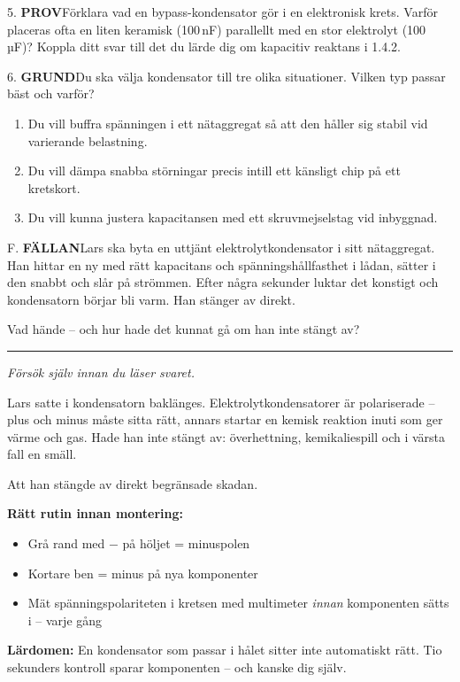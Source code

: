 \documentclass[a4paper,11pt,twoside]{book}
\newcommand{\qgrund}{\colorbox{greenpale}{\textcolor{greendark}{\headingfont\bfseries\tiny GRUND}}}
\newcommand{\qprov}{\colorbox{redpale}{\textcolor{reddark}{\headingfont\bfseries\tiny PROV}}}
\newcommand{\qfallan}{\colorbox{ljusbrun}{\textcolor{kakao}{\headingfont\bfseries\tiny FÄLLAN}}}
\begin{document}
\begin{qblock}{5.}
\qprov\quad Förklara vad en bypass-kondensator gör i en 
elektronisk krets. Varför placeras ofta en liten keramisk 
(100\,nF) parallellt med en stor elektrolyt (100\,µF)?
Koppla ditt svar till det du lärde dig om kapacitiv 
reaktans i 1.4.2.
\end{qblock}

\begin{qblock}{6.}
\qgrund\quad Du ska välja kondensator till tre olika 
situationer. Vilken typ passar bäst och varför?
\begin{enumerate}[label=\alph*)]
  \item Du vill buffra spänningen i ett nätaggregat så 
        att den håller sig stabil vid varierande belastning.
  \item Du vill dämpa snabba störningar precis intill 
        ett känsligt chip på ett kretskort.
  \item Du vill kunna justera kapacitansen med ett 
        skruvmejselstag vid inbyggnad.
\end{enumerate}
\end{qblock}

\begin{qblock}{F.}
\qfallan\quad Lars ska byta en uttjänt elektrolytkondensator 
i sitt nätaggregat. Han hittar en ny med rätt kapacitans och 
spänningshållfasthet i lådan, sätter i den snabbt och slår 
på strömmen. Efter några sekunder luktar det konstigt och 
kondensatorn börjar bli varm. Han stänger av direkt.

Vad hände -- och hur hade det kunnat gå om han inte stängt 
av?
\end{qblock}

\medskip
\noindent\rule{\textwidth}{0.4pt}
{\small\itshape Försök själv innan du läser svaret.}
\medskip

\begin{worked}[title={Lösning -- Fallgropsfråga 1.4.3\,F}]
Lars satte i kondensatorn baklänges. Elektrolytkondensatorer 
är polariserade -- plus och minus måste sitta rätt, annars 
startar en kemisk reaktion inuti som ger värme och gas. 
Hade han inte stängt av: överhettning, kemikaliespill och 
i värsta fall en smäll.

Att han stängde av direkt begränsade skadan.

\medskip
\textbf{Rätt rutin innan montering:}
\begin{itemize}
  \item Grå rand med ${-}$ på höljet = minuspolen
  \item Kortare ben = minus på nya komponenter
  \item Mät spänningspolariteten i kretsen med multimeter 
        \emph{innan} komponenten sätts i -- varje gång
\end{itemize}

\textbf{Lärdomen:} En kondensator som passar i hålet sitter 
inte automatiskt rätt. Tio sekunders kontroll sparar 
komponenten -- och kanske dig själv.
\end{worked}
\end{document}
